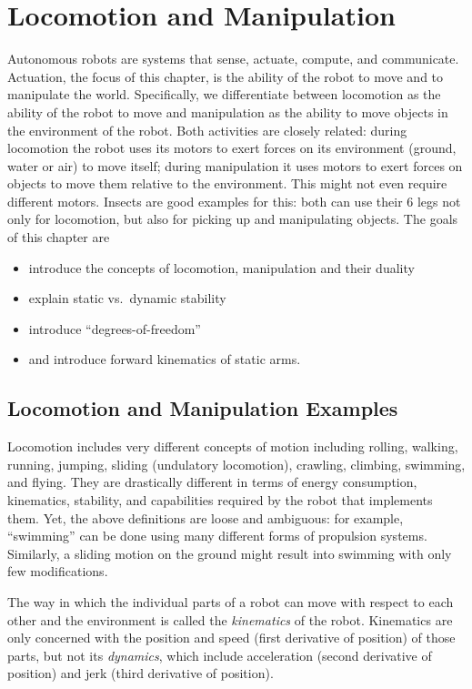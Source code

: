 \chapter{Locomotion and Manipulation}\label{chap:locomotion}
Autonomous robots are systems that sense, actuate, compute, and communicate. Actuation, the focus of this chapter, is the ability of the robot to move and to manipulate the world. Specifically, we differentiate between locomotion as the ability of the robot to move and manipulation as the ability to move objects in the environment of the robot. Both activities are closely related: during locomotion the robot uses its motors to exert forces on its environment (ground, water or air) to move itself; during manipulation it uses motors to exert forces on objects to move them relative to the environment. This might not even require different motors. Insects are good examples for this: both can use their 6 legs not only for locomotion, but also for picking up and manipulating objects. The goals of this chapter are
\begin{itemize}
\item introduce the concepts of locomotion, manipulation and their duality
\item explain static vs.\ dynamic stability
\item introduce ``degrees-of-freedom''
\item and introduce forward kinematics of static arms.
\end{itemize}

\section{Locomotion and Manipulation Examples}
Locomotion includes very different concepts of motion including rolling, walking, running, jumping, sliding (undulatory locomotion), crawling, climbing, swimming, and flying. They are drastically different in terms of energy consumption, kinematics, stability, and capabilities required by the robot that implements them. Yet, the above definitions are loose and ambiguous: for example, ``swimming'' can be done using many different forms of propulsion systems. Similarly, a sliding motion on the ground might result into swimming with only few modifications.

The way in which the individual parts of a robot can move with respect to each other and the environment is called the \emph{kinematics} of the robot. Kinematics are only concerned with the position and speed (first derivative of position) of those parts, but not its \emph{dynamics}, which include acceleration (second derivative of position) and jerk (third derivative of position).

